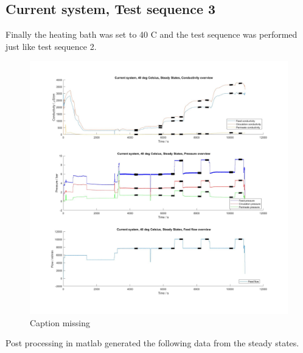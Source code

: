\newpage

\subsection{Current system, Test sequence 3}

Finally the heating bath was set to 40 C and the test sequence was performed just like test sequence 2. 

\begin{figure}[H]
    \centering
    \includegraphics[width=1.1\textwidth]{overview40}
    \caption{Caption missing}
    \label{fig:overw40}
\end{figure}

\newpage

Post processing in matlab generated the following data from the steady states.

